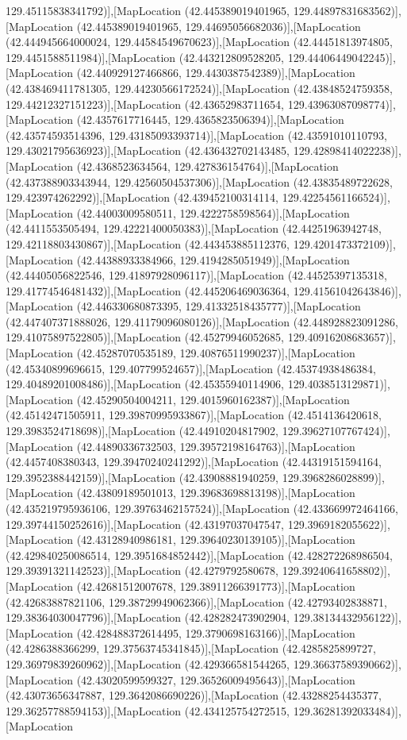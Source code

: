 129.45115838341792)],[MapLocation (42.445389019401965, 129.44897831683562)],[MapLocation (42.445389019401965, 129.44695056682036)],[MapLocation (42.444945664000024, 129.44584549670623)],[MapLocation (42.44451813974805, 129.4451588511984)],[MapLocation (42.443212809528205, 129.44406449042245)],[MapLocation (42.440929127466866, 129.4430387542389)],[MapLocation (42.438469411781305, 129.44230566172524)],[MapLocation (42.43848524759358, 129.44212327151223)],[MapLocation (42.43652983711654, 129.43963087098774)],[MapLocation (42.4357617716445, 129.4365823506394)],[MapLocation (42.43574593514396, 129.43185093393714)],[MapLocation (42.43591010110793, 129.43021795636923)],[MapLocation (42.436432702143485, 129.42898414022238)],[MapLocation (42.4368523634564, 129.427836154764)],[MapLocation (42.437388903343944, 129.42560504537306)],[MapLocation (42.43835489722628, 129.423974262292)],[MapLocation (42.439452100314114, 129.42254561166524)],[MapLocation (42.44003009580511, 129.4222758598564)],[MapLocation (42.4411553505494, 129.42221400050383)],[MapLocation (42.44251963942748, 129.42118803430867)],[MapLocation (42.443453885112376, 129.4201473372109)],[MapLocation (42.44388933384966, 129.4194285051949)],[MapLocation (42.44405056822546, 129.41897928096117)],[MapLocation (42.44525397135318, 129.41774546481432)],[MapLocation (42.445206469036364, 129.41561042643846)],[MapLocation (42.446330680873395, 129.41332518435777)],[MapLocation (42.447407371888026, 129.41179096080126)],[MapLocation (42.448928823091286, 129.41075897522805)],[MapLocation (42.45279946052685, 129.40916208683657)],[MapLocation (42.45287070535189, 129.40876511990237)],[MapLocation (42.45340899696615, 129.407799524657)],[MapLocation (42.45374938486384, 129.40489201008486)],[MapLocation (42.45355940114906, 129.4038513129871)],[MapLocation (42.45290504004211, 129.4015960162387)],[MapLocation (42.45142471505911, 129.39870995933867)],[MapLocation (42.4514136420618, 129.3983524718698)],[MapLocation (42.44910204817902, 129.39627107767424)],[MapLocation (42.44890336732503, 129.39572198164763)],[MapLocation (42.4457408380343, 129.39470240241292)],[MapLocation (42.44319151594164, 129.3952388442159)],[MapLocation (42.43908881940259, 129.3968286028899)],[MapLocation (42.43809189501013, 129.39683698813198)],[MapLocation (42.435219795936106, 129.39763462157524)],[MapLocation (42.433669972464166, 129.39744150252616)],[MapLocation (42.43197037047547, 129.3969182055622)],[MapLocation (42.43128940986181, 129.39640230139105)],[MapLocation (42.429840250086514, 129.3951684852442)],[MapLocation (42.428272268986504, 129.39391321142523)],[MapLocation (42.4279792580678, 129.39240641658802)],[MapLocation (42.42681512007678, 129.38911266391773)],[MapLocation (42.42683887821106, 129.38729949062366)],[MapLocation (42.42793402838871, 129.38364030047796)],[MapLocation (42.428282473902904, 129.38134432956122)],[MapLocation (42.428488372614495, 129.3790698163166)],[MapLocation (42.4286388366299, 129.37563745341845)],[MapLocation (42.4285825899727, 129.36979839260962)],[MapLocation (42.429366581544265, 129.36637589390662)],[MapLocation (42.43020599599327, 129.36526009495643)],[MapLocation (42.43073656347887, 129.3642086690226)],[MapLocation (42.43288254435377, 129.36257788594153)],[MapLocation (42.434125754272515, 129.36281392033484)],[MapLocation 